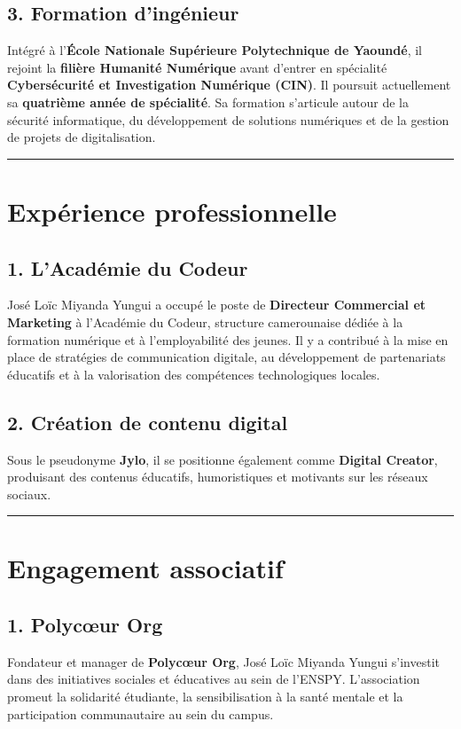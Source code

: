 \documentclass[12pt]{article}
\begin{document}
\subsection*{3. Formation d’ingénieur}
Intégré à l’\textbf{École Nationale Supérieure Polytechnique de Yaoundé}, il rejoint la \textbf{filière Humanité Numérique} avant d’entrer en spécialité \textbf{Cybersécurité et Investigation Numérique (CIN)}.  
Il poursuit actuellement sa \textbf{quatrième année de spécialité}.  
Sa formation s’articule autour de la sécurité informatique, du développement de solutions numériques et de la gestion de projets de digitalisation.

\vspace{0.5cm}
\hrule
\vspace{0.5cm}

\section*{Expérience professionnelle}

\subsection*{1. L’Académie du Codeur}
José Loïc Miyanda Yungui a occupé le poste de \textbf{Directeur Commercial et Marketing} à l’Académie du Codeur, structure camerounaise dédiée à la formation numérique et à l’employabilité des jeunes.  
Il y a contribué à la mise en place de stratégies de communication digitale, au développement de partenariats éducatifs et à la valorisation des compétences technologiques locales.

\subsection*{2. Création de contenu digital}
Sous le pseudonyme \textbf{Jylo}, il se positionne également comme \textbf{Digital Creator}, produisant des contenus éducatifs, humoristiques et motivants sur les réseaux sociaux.

\vspace{0.5cm}
\hrule
\vspace{0.5cm}

\section*{Engagement associatif}

\subsection*{1. Polycœur Org}
Fondateur et manager de \textbf{Polycœur Org}, José Loïc Miyanda Yungui s’investit dans des initiatives sociales et éducatives au sein de l’ENSPY.  
L’association promeut la solidarité étudiante, la sensibilisation à la santé mentale et la participation communautaire au sein du campus.
\end{document}
